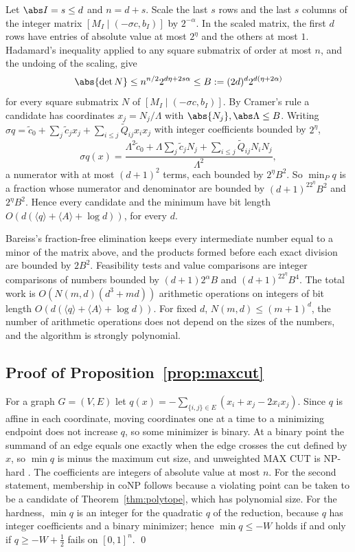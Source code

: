Let $\abs I=s\le d$ and $n=d+s$. Scale the last $s$ rows and the last $s$
columns of the integer matrix $[M_I\mid(-\sigma c,b_I)]$ by $2^{-\alpha}$. In
the scaled matrix, the first $d$ rows have entries of absolute value at most
$2^\eta$ and the others at most $1$. Hadamard's inequality applied to any
square submatrix of order at most $n$, and the undoing of the scaling, give
\[
\abs{\det N}\le n^{n/2}2^{d\eta+2s\alpha}\le B:=(2d)^d2^{d(\eta+2\alpha)}
\]
for every square submatrix $N$ of $[M_I\mid(-\sigma c,b_I)]$. By Cramer's rule a
candidate has coordinates $x_j=N_j/\Lambda$ with $\abs{N_j},\abs\Lambda\le B$.
Writing $\sigma q=\tilde c_0+\sum_j\tilde c_jx_j+\sum_{i\le j}\tilde Q_{ij}x_ix_j$
with integer coefficients bounded by $2^\eta$,
\[
\sigma q(x)=\frac{\Lambda^2\tilde c_0+\Lambda\sum_j\tilde c_jN_j+\sum_{i\le j}\tilde Q_{ij}N_iN_j}{\Lambda^2},
\]
a numerator with at most $(d+1)^2$ terms, each bounded by $2^\eta B^2$. So
$\min_Pq$ is a fraction whose numerator and denominator are bounded by
$(d+1)^22^{\eta}B^2$ and $2^{\eta}B^2$. Hence every candidate and the minimum
have bit length $O(d(\langle q\rangle+\langle A\rangle+\log d))$, for every $d$.

Bareiss's fraction-free elimination keeps every intermediate number equal to
a minor of the matrix above, and the products formed before each exact
division are bounded by $2B^2$. Feasibility tests and value comparisons are
integer comparisons of numbers bounded by $(d+1)2^\alpha B$ and
$(d+1)^22^\eta B^4$. The total work is $O(N(m,d)(d^3+md))$ arithmetic
operations on integers of bit length $O(d(\langle q\rangle+\langle A\rangle+\log d))$.
For fixed $d$, $N(m,d)\le(m+1)^d$, the number of arithmetic operations does
not depend on the sizes of the numbers, and the algorithm is strongly
polynomial.

\subsection{Proof of Proposition~\ref{prop:maxcut}}

For a graph $G=(V,E)$ let $q(x)=-\sum_{\{i,j\}\in E}(x_i+x_j-2x_ix_j)$. Since
$q$ is affine in each coordinate, moving coordinates one at a time to a
minimizing endpoint does not increase $q$, so some minimizer is binary. At a
binary point the summand of an edge equals one exactly when the edge crosses
the cut defined by $x$, so $\min q$ is minus the maximum cut size, and
unweighted MAX CUT is NP-hard \citep{Karp1972,GareyJohnsonStockmeyer1976}. The
coefficients are integers of absolute value at most $n$. For the second
statement, membership in coNP follows because a violating point can be taken
to be a candidate of Theorem~\ref{thm:polytope}, which has polynomial size.
For the hardness, $\min q$ is an integer for the quadratic $q$ of the
reduction, because $q$ has integer coefficients and a binary minimizer; hence
$\min q\le-W$ holds if and only if $q\ge-W+\tfrac12$ fails on $[0,1]^n$. \qed
